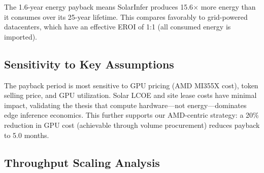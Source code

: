 \documentclass[conference,10pt,letterpaper]{IEEEtran}
\begin{document}
The 1.6-year energy payback means SolarInfer produces 15.6$\times$ more energy than it consumes over its 25-year lifetime. This compares favorably to grid-powered datacenters, which have an effective EROI of 1:1 (all consumed energy is imported).

\subsection{Sensitivity to Key Assumptions}

\begin{table}[!t]
\caption{Sensitivity Analysis: Edge SKU Payback Period}
\label{tab:sensitivity}
\centering\scriptsize
{}
\end{table}

The payback period is most sensitive to GPU pricing (AMD MI355X cost), token selling price, and GPU utilization. Solar LCOE and site lease costs have minimal impact, validating the thesis that compute hardware---not energy---dominates edge inference economics. This further supports our AMD-centric strategy: a 20\% reduction in GPU cost (achievable through volume procurement) reduces payback to 5.0 months.

\subsection{Throughput Scaling Analysis}
\end{document}

